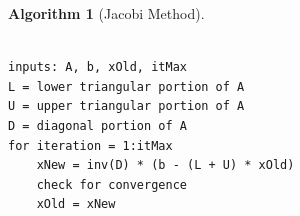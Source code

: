 \documentclass[12pt,letterpaper]{article}
\theoremstyle{definition}
\newtheorem{algorithm}[thm]{Algorithm}
\begin{document}
\begin{algorithm}[Jacobi Method]
\footnotesize
\begin{verbatim}

inputs: A, b, xOld, itMax
L = lower triangular portion of A
U = upper triangular portion of A
D = diagonal portion of A
for iteration = 1:itMax
    xNew = inv(D) * (b - (L + U) * xOld)
    check for convergence
    xOld = xNew
\end{verbatim}
\end{algorithm}
%




\end{document}
